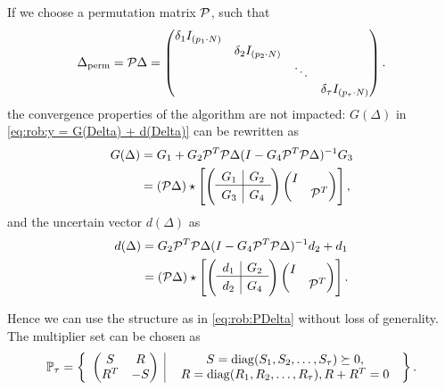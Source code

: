 If we choose a permutation matrix $\mathcal{P}$, such that 
\begin{align}
\label{eq:rob:PDelta}
\Delta_\text{perm}= 
\mathcal{P} \Delta =
\begin{pmatrix}
\delta_1 I_{(p_1\cdot N)} & & &\\
& \delta_2 I_{(p_2\cdot N)} & & \\
& & \ddots & \\
& & & \delta_\tau I_{(p_\tau \cdot N)}
\end{pmatrix}.
\end{align}
the convergence properties of the algorithm are not impacted: $G(\Delta)$ in \eqref{eq:rob:y = G(Delta) + d(Delta)} can be rewritten as 
\begin{align}
G(\Delta) &= G_1 + G_2  \c{P}^T \c{P} \Delta(I - G_4 \c{P}^T \c{P} \Delta)^{-1}G_3 \\
&= 
(\c{P}\Delta) \star \left[\left(\begin{array}{c | c}
G_1 & G_2 \\ \hline
G_3 & G_4
\end{array}\right)\begin{pmatrix}
I & \\ & \c{P}^T
\end{pmatrix}\right],
\end{align}
and the uncertain vector $d(\Delta)$ as 
\begin{align}
d(\Delta) &= G_2\c{P}^T\c{P} \Delta (I - G_4\c{P}^T\c{P}\Delta)^{-1} d_2 + d_1 \\
&= 
(\c{P}\Delta) \star \left[\left(\begin{array}{c | c}
d_1 & G_2  \\ \hline
d_2 & G_4 
\end{array}\right)\begin{pmatrix}
I & \\ & \c{P}^T
\end{pmatrix}\right].
\end{align}

Hence we can use the structure as in \eqref{eq:rob:PDelta} without loss of generality.
The multiplier set can be chosen as 
\begin{align}
\mathbb{P}_\tau =\left\{\begin{array}{c|c}
\begin{pmatrix}
S & R \\ R^T & -S
\end{pmatrix}
& \; \begin{array}{c} S = \operatorname*{diag}(S_1, S_2, \dots, S_\tau)\succeq 0,\\ R = \operatorname*{diag}(R_1, R_2, \dots, R_\tau), R + R^T = 0\end{array} \end{array}
\right\}.
\end{align}

